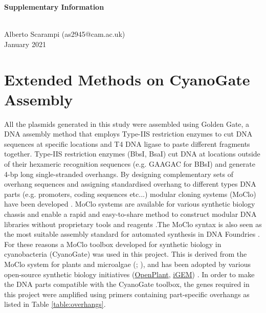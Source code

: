 
\begin{center}
\begin{LARGE}
\textbf{Supplementary Information}
\end{LARGE}\\
Alberto Scarampi (as2945@cam.ac.uk)\\
January 2021 
\end{center}

\section{Extended Methods on CyanoGate Assembly}
\label{sec:cyanogate}
All the plasmids generated in this study were assembled using Golden Gate, a DNA assembly method that employs Type-IIS restriction enzymes to cut DNA sequences at specific locations and T4 DNA ligase to paste different fragments together. Type-IIS restriction enzymes (BbsI, BsaI) cut DNA at locations outside of their hexameric recognition sequences  (e.g. GAAGAC for BBsI) and generate 4-bp long single-stranded overhangs. By designing complementary sets of overhang sequences and assigning standardised overhang to different types DNA parts (e.g. promoters, coding sequences etc...) modular cloning systems (MoClo) have been developed \citep{Weber2011}. MoClo systems are available for various synthetic biology chassis and enable a rapid and easy-to-share method to construct modular DNA libraries without proprietary tools and reagents \citep{Patron2015}.The MoClo syntax is also seen as the most suitable assembly standard for automated synthesis in DNA Foundries \citep{Chambers2016}.
For these reasons a MoClo toolbox developed for synthetic biology in cyanobacteria (CyanoGate) was used in this project. This is derived from the MoClo system for plants and microalgae (\citealt{Engler2014}; \citealt{Crozet2018}), and has been adopted by various open-source synthetic biology initiatives (\href{https://www.openplant.org/}{OpenPlant}, \href{http://parts.igem.org/Main_Page}{iGEM}) \citep{Vasudevan2019}. In order to make the DNA parts compatible with the CyanoGate toolbox,  the genes required in this project were amplified using primers containing part-specific overhangs as listed in Table \ref{table:overhangs}.

